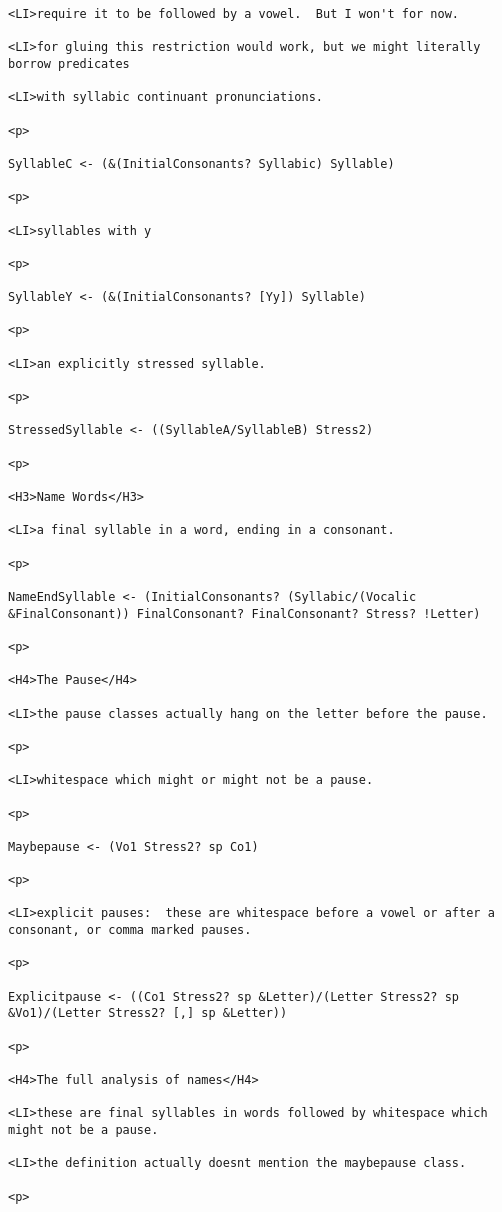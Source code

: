 \documentclass[12pt]{article}
\begin{document}
\begin{lstlisting}
<LI>require it to be followed by a vowel.  But I won't for now.

<LI>for gluing this restriction would work, but we might literally borrow predicates

<LI>with syllabic continuant pronunciations.

<p>

SyllableC <- (&(InitialConsonants? Syllabic) Syllable)

<p>

<LI>syllables with y

<p>

SyllableY <- (&(InitialConsonants? [Yy]) Syllable)

<p>

<LI>an explicitly stressed syllable.

<p>

StressedSyllable <- ((SyllableA/SyllableB) Stress2)

<p>

<H3>Name Words</H3>

<LI>a final syllable in a word, ending in a consonant.

<p>

NameEndSyllable <- (InitialConsonants? (Syllabic/(Vocalic &FinalConsonant)) FinalConsonant? FinalConsonant? Stress? !Letter)

<p>

<H4>The Pause</H4>

<LI>the pause classes actually hang on the letter before the pause.

<p>

<LI>whitespace which might or might not be a pause.

<p>

Maybepause <- (Vo1 Stress2? sp Co1)

<p>

<LI>explicit pauses:  these are whitespace before a vowel or after a consonant, or comma marked pauses.

<p>

Explicitpause <- ((Co1 Stress2? sp &Letter)/(Letter Stress2? sp &Vo1)/(Letter Stress2? [,] sp &Letter))

<p>

<H4>The full analysis of names</H4>

<LI>these are final syllables in words followed by whitespace which might not be a pause.

<LI>the definition actually doesnt mention the maybepause class.

<p>


\end{lstlisting}
\end{document}

